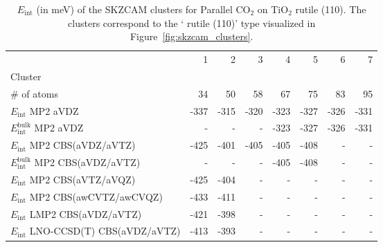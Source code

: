 \begin{table}
\caption{\label{tab:system_eint_r-tio2_co2_parallel}$E_\textrm{int}$ (in meV) of the SKZCAM clusters for Parallel CO$_2$ on TiO$_2$ rutile (110). The clusters correspond to the ` rutile (110)' type visualized in Figure~\ref{fig:skzcam_clusters}.}
\begin{adjustbox}{center,max width=1.4\textwidth}
\begin{tabular}{lrrrrrrr}
\toprule
 & 1 & 2 & 3 & 4 & 5 & 6 & 7 \\ 
Cluster &  &  &  &  &  &  &  \\
\midrule
\# of atoms & 34 & 50 & 58 & 67 & 75 & 83 & 95 \\
$E_\textrm{int}$ MP2 aVDZ & -337 & -315 & -320 & -323 & -327 & -326 & -331 \\
$E_\textrm{int}^\textrm{bulk}$ MP2 aVDZ & - & - & - & -323 & -327 & -326 & -331 \\
$E_\textrm{int}$ MP2 CBS(aVDZ/aVTZ) & -425 & -401 & -405 & -405 & -408 & - & - \\
$E_\textrm{int}^\textrm{bulk}$ MP2 CBS(aVDZ/aVTZ) & - & - & - & -405 & -408 & - & - \\
$E_\textrm{int}$ MP2 CBS(aVTZ/aVQZ) & -425 & -404 & - & - & - & - & - \\
$E_\textrm{int}$ MP2 CBS(awCVTZ/awCVQZ) & -433 & -411 & - & - & - & - & - \\
$E_\textrm{int}$ LMP2 CBS(aVDZ/aVTZ) & -421 & -398 & - & - & - & - & - \\
$E_\textrm{int}$ LNO-CCSD(T) CBS(aVDZ/aVTZ) & -413 & -393 & - & - & - & - & - \\
\bottomrule
\end{tabular}
\end{adjustbox}
\end{table}

